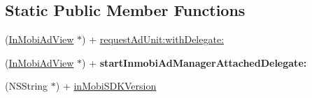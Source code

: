 \subsection*{Static Public Member Functions}
\begin{DoxyCompactItemize}
\item 
(\hyperlink{interface_in_mobi_ad_view}{InMobiAdView} $\ast$) + \hyperlink{interface_in_mobi_ad_manager_a076f2f74984f6dcd142cd12673b5b827}{requestAdUnit:withDelegate:}
\item 
\hypertarget{interface_in_mobi_ad_manager_ae1482f52b4a89493a0c11b0adafabca2}{
(\hyperlink{interface_in_mobi_ad_view}{InMobiAdView} $\ast$) + {\bfseries startInmobiAdManagerAttachedDelegate:}}
\label{interface_in_mobi_ad_manager_ae1482f52b4a89493a0c11b0adafabca2}

\item 
(NSString $\ast$) + \hyperlink{interface_in_mobi_ad_manager_ad50af257f1c84d8e359c9789ee5bc2fb}{inMobiSDKVersion}
\end{DoxyCompactItemize}
